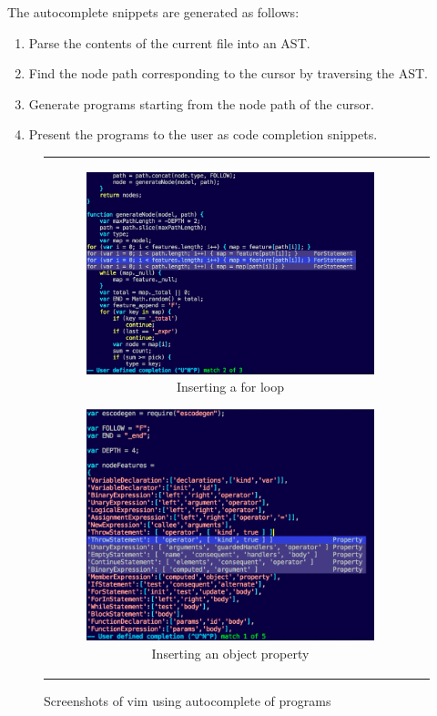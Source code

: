 \documentclass{article}
\begin{document}
The autocomplete snippets are generated as follows:
\begin{enumerate}
	\item Parse the contents of the current file into an AST.
	\item Find the node path corresponding to the cursor by traversing the AST.
	\item Generate programs starting from the node path of the cursor.
	\item Present the programs to the user as code completion snippets.
\end{enumerate}

\begin{figure}[ht]
	\centering
	\begin{tabular}{c c}
		\begin{subfigure}[h]{6.25cm}
			\centering
			\includegraphics[width=1.00\textwidth]{vim1}
			\caption{Inserting a for loop} \label{fig:vim1}
		\end{subfigure}
		\begin{subfigure}[h]{6cm}
			\centering
			\includegraphics[width=1.00\textwidth]{vim2}
			\caption{Inserting an object property} \label{fig:vim2}
		\end{subfigure}
	\end{tabular}
	\caption{Screenshots of vim using autocomplete of programs}
\end{figure}
\end{document}
